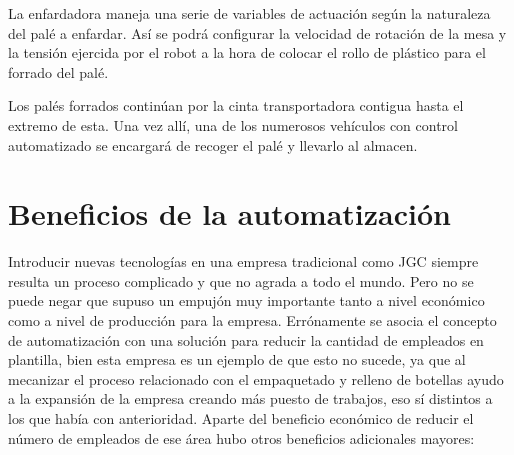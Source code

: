 \documentclass[11pt,a4paper,spanish,twoside]{report}
\begin{document}
La enfardadora maneja una serie de variables de actuación según la na\-tu\-ra\-le\-za
del palé a enfardar. Así se podrá configurar la velocidad de rotación de la 
mesa y la tensión ejercida por el robot a la hora de colocar el rollo de 
plástico para el forrado del palé.

Los palés forrados continúan por la cinta transportadora contigua hasta el 
extremo de esta. Una vez allí, una de los numerosos vehículos con control 
automatizado se encargará de recoger el palé y llevarlo al almacen.

\chapter{Beneficios de la automatización}
Introducir nuevas tecnologías en una empresa tradicional como JGC siempre
resulta un proceso complicado y que no agrada a todo el mundo. Pero no se
puede negar que supuso un empujón muy importante tanto a nivel económico como
a nivel de producción para la empresa. Errónamente se asocia el concepto de
automatización con una solución para reducir la cantidad de empleados en
plantilla, bien esta empresa es un ejemplo de que esto no sucede, ya que al
mecanizar el proceso relacionado con el empaquetado y relleno de botellas
ayudo a la expansión de la empresa creando más puesto de trabajos, eso sí
distintos a los que había con anterioridad. Aparte del beneficio económico de
reducir el número de empleados de ese área hubo otros beneficios adicionales
mayores:
\end{document}

